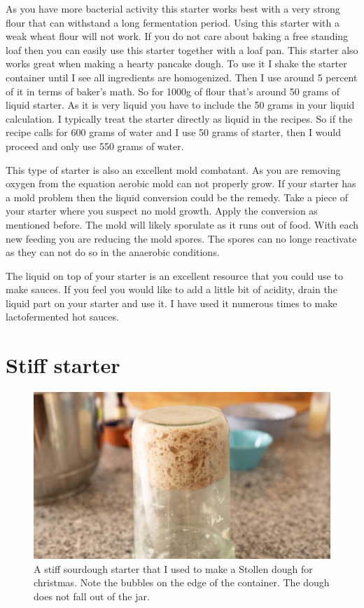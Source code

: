 As you have more bacterial activity this starter works best with a very strong
flour that can withstand a long fermentation period. Using this starter with a
weak wheat flour will not work. If you do not care about baking a free
standing loaf then you can easily use this starter together with a loaf pan.
This starter also works great when making a hearty pancake dough. To use it I
shake the starter container until I see all ingredients are homogenized. Then
I use around 5 percent of it in terms of baker's math. So for 1000g of flour
that's around 50 grams of liquid starter. As it is very liquid you have to
include the 50 grams in your liquid calculation. I typically treat the starter
directly as liquid in the recipes. So if the recipe calls for 600 grams of water
and I use 50 grams of starter, then I would proceed and only use 550 grams of
water.

This type of starter is also an excellent mold combatant. As you are removing
oxygen from the equation aerobic mold can not properly grow. If your starter
has a mold problem then the liquid conversion could be the remedy. Take a
piece of your starter where you suspect no mold growth. Apply the conversion
as mentioned before. The mold will likely sporulate as it runs out of food.
With each new feeding you are reducing the mold spores. The spores can no
longe reactivate as they can not do so in the anaerobic conditions.

The liquid on top of your starter is an excellent resource that you could use
to make sauces. If you feel you would like to add a little bit of acidity,
drain the liquid part on your starter and use it. I have used it numerous
times to make lactofermented hot sauces.

\section{Stiff starter}
\label{section:stiff-starter}

\begin{figure}[!htb]
  \includegraphics[width=\textwidth]{sourdough-starter-stiff.jpg}
  \caption{A stiff sourdough starter that I used to make a Stollen dough for christmas. Note
  the bubbles on the edge of the container. The dough does not fall out of the jar.}
  \label{fig:stiff-sourdough-starter}
\end{figure}

